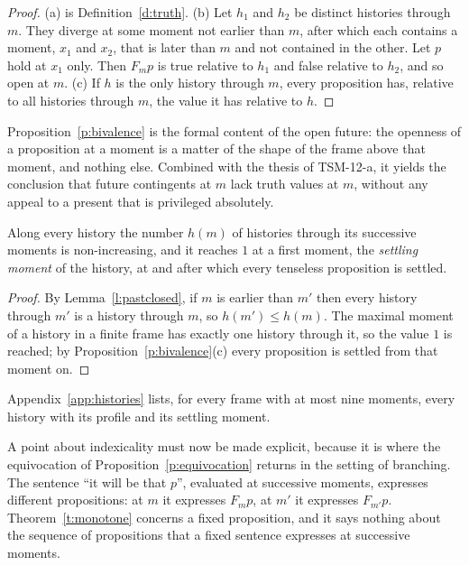 \documentclass{situationist-preprint}
\begin{document}
\begin{proof}
(a) is Definition~\ref{d:truth}. (b) Let $h_1$ and $h_2$ be distinct histories through $m$. They diverge at some moment not earlier than $m$, after which each contains a moment, $x_1$ and $x_2$, that is later than $m$ and not contained in the other. Let $p$ hold at $x_1$ only. Then $F_m p$ is true relative to $h_1$ and false relative to $h_2$, and so open at $m$. (c) If $h$ is the only history through $m$, every proposition has, relative to all histories through $m$, the value it has relative to $h$.
\end{proof}

Proposition~\ref{p:bivalence} is the formal content of the open future: the openness of a proposition at a moment is a matter of the shape of the frame above that moment, and nothing else. Combined with the thesis of TSM-12-a, it yields the conclusion that future contingents at $m$ lack truth values at $m$, without any appeal to a present that is privileged absolutely.

\begin{corollary}\label{c:profile}
Along every history the number $h(m)$ of histories through its successive moments is non-increasing, and it reaches $1$ at a first moment, the \emph{settling moment} of the history, at and after which every tenseless proposition is settled.
\end{corollary}

\begin{proof}
By Lemma~\ref{l:pastclosed}, if $m$ is earlier than $m'$ then every history through $m'$ is a history through $m$, so $h(m') \leq h(m)$. The maximal moment of a history in a finite frame has exactly one history through it, so the value $1$ is reached; by Proposition~\ref{p:bivalence}(c) every proposition is settled from that moment on.
\end{proof}

Appendix~\ref{app:histories} lists, for every frame with at most nine moments, every history with its profile and its settling moment.

A point about indexicality must now be made explicit, because it is where the equivocation of Proposition~\ref{p:equivocation} returns in the setting of branching. The sentence \enquote{it will be that $p$}, evaluated at successive moments, expresses different propositions: at $m$ it expresses $F_m p$, at $m'$ it expresses $F_{m'} p$. Theorem~\ref{t:monotone} concerns a fixed proposition, and it says nothing about the sequence of propositions that a fixed sentence expresses at successive moments.
\end{document}
